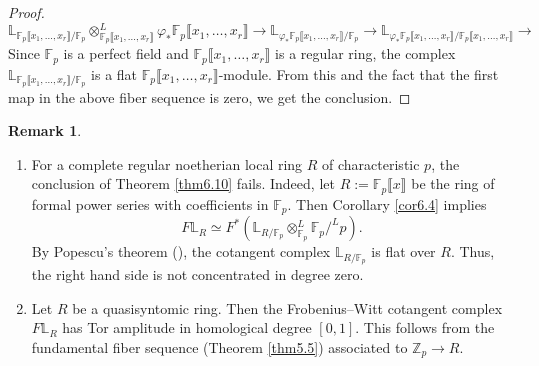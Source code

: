 \documentclass[11pt, a4paper]{amsart}
\theoremstyle{plain}
\theoremstyle{definition}
\newtheorem{remark}[theorem]{Remark}
\begin{document}
\begin{proof}
    \[\mathbb L_{\mathbb F_p\llbracket x_1,\dots,x_r\rrbracket/\mathbb F_p}\otimes_{\mathbb F_p\llbracket x_1,\dots,x_r\rrbracket}^L\varphi_*{\mathbb F_p\llbracket x_1,\dots,x_r\rrbracket}\to \mathbb L_{\varphi_*\mathbb F_p\llbracket x_1,\dots,x_r\rrbracket/\mathbb F_p}\to \mathbb L_{\varphi_*\mathbb F_p\llbracket x_1,\dots,x_r\rrbracket/\mathbb F_p\llbracket x_1,\dots,x_r\rrbracket}\to\]
Since $\mathbb F_p$ is a perfect field and $\mathbb F_p\llbracket x_1,\dots,x_r\rrbracket$ is a regular ring, the complex $\mathbb L_{\mathbb F_p\llbracket x_1,\dots,x_r\rrbracket/\mathbb F_p}$ is a flat $\mathbb F_p\llbracket x_1,\dots,x_r\rrbracket$-module. From this and the fact that the first map in the above fiber sequence is zero, we get the conclusion.
\end{proof}

\begin{remark}\label{rem6.11}\begin{enumerate}
    \item For a complete regular noetherian local ring $R$ of characteristic $p$, the conclusion of Theorem \ref{thm6.10} fails. Indeed, let $R:=\mathbb F_p\llbracket x\rrbracket$ be the ring of formal power series with coefficients in $\mathbb F_p$. Then Corollary \ref{cor6.4} implies \[F\mathbb L_R\simeq F^*(\mathbb L_{R/{\mathbb F_p}}\otimes^L_{\mathbb F_p}\mathbb F_p/^Lp).\] By Popescu's theorem (\cite[Tag 07GC]{Sta26}), the cotangent complex $\mathbb L_{R/\mathbb F_p}$ is flat over $R$. Thus, the right hand side is not concentrated in degree zero.
    \item Let $R$ be a quasisyntomic ring. Then the Frobenius--Witt cotangent complex $F\mathbb L_R$ has Tor amplitude in homological degree $[0,1]$. This follows from the fundamental fiber sequence (Theorem \ref{thm5.5}) associated to $\mathbb Z_p\to R$.
\end{enumerate}
\end{remark}
\end{document}
